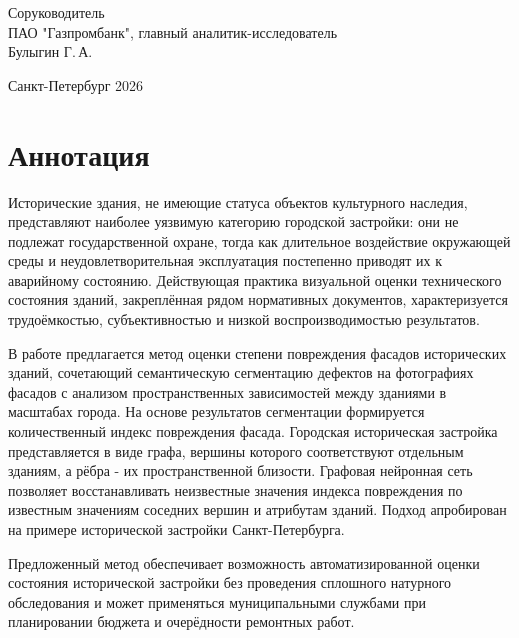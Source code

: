 \documentclass[14pt]{extarticle}
\begin{document}
\begin{titlepage}
	\vspace{0.8cm}
	\hfill
	\begin{minipage}{0.45\textwidth}
		\begin{flushleft}
			{\normalsize Соруководитель}\\
			{\normalsize ПАО "Газпромбанк", главный аналитик-исследователь}\\
			{\normalsize Булыгин Г.\,А.}\\
		\end{flushleft}
	\end{minipage}

    \vspace{1.2cm}
    \begin{center}
        Санкт-Петербург 2026
    \end{center}
    \restoregeometry
\end{titlepage}

\section*{Аннотация}
\label{sec:intro}
Исторические здания, не имеющие статуса объектов культурного наследия, представляют наиболее уязвимую категорию городской застройки: они не подлежат государственной охране, тогда как длительное воздействие окружающей среды и неудовлетворительная эксплуатация постепенно приводят их к аварийному состоянию. Действующая практика визуальной оценки технического состояния зданий, закреплённая рядом нормативных документов, характеризуется трудоёмкостью, субъективностью и низкой воспроизводимостью результатов.

В работе предлагается метод оценки степени повреждения фасадов исторических зданий, сочетающий семантическую сегментацию дефектов на фотографиях фасадов с анализом пространственных зависимостей между зданиями в масштабах города. На основе результатов сегментации формируется количественный индекс повреждения фасада. Городская историческая застройка представляется в виде графа, вершины которого соответствуют отдельным зданиям, а рёбра - их пространственной близости. Графовая нейронная сеть позволяет восстанавливать неизвестные значения индекса повреждения по известным значениям соседних вершин и атрибутам зданий. Подход апробирован на примере исторической застройки Санкт-Петербурга.

Предложенный метод обеспечивает возможность автоматизированной оценки состояния исторической застройки без проведения сплошного натурного обследования и может применяться муниципальными службами при планировании бюджета и очерёдности ремонтных работ.
\end{document}
